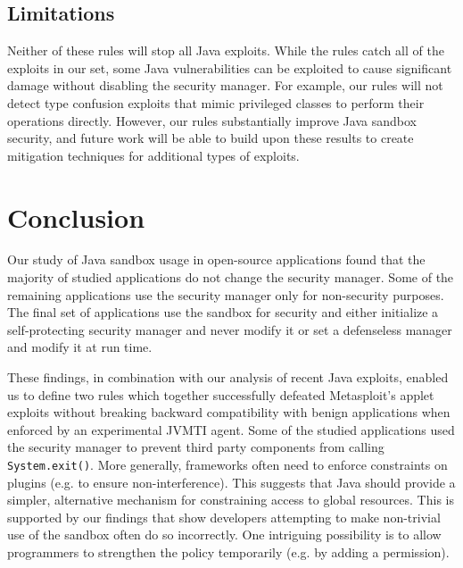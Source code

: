 \documentclass{sig-alternate}
\begin{document}
\subsection{Limitations}

Neither of these rules will stop all Java exploits. While the rules
catch all of the exploits in our set, some Java vulnerabilities can
be exploited to cause significant damage without disabling the security
manager. For example, our rules will not detect type confusion exploits
that mimic privileged classes to perform their operations directly.
However, our rules substantially improve Java sandbox security, and
future work will be able to build upon these results to create mitigation
techniques for additional types of exploits.

\section{Conclusion}

Our study of Java sandbox usage in open-source applications found
that the majority of studied applications do not change the security
manager. Some of the remaining applications use the security manager
only for non-security purposes. The final set of applications use
the sandbox for security and either initialize a self-protecting security
manager and never modify it or set a defenseless manager and modify
it at run time. 

These findings, in combination with our analysis of recent Java exploits,
enabled us to define two rules which together successfully
defeated Metasploit's applet exploits without breaking backward compatibility with benign applications when enforced by an experimental JVMTI agent. Some of the studied applications
used the security manager to prevent third party components from calling
\texttt{System.exit()}. More generally, frameworks often need to enforce
constraints on plugins (e.g. to ensure non-interference). This suggests
that Java should provide a simpler, alternative mechanism for constraining
access to global resources. This is supported by our findings that
show developers attempting to make non-trivial use of the sandbox
often do so incorrectly. One intriguing possibility is to allow programmers
to strengthen the policy temporarily (e.g. by adding a permission). 
\end{document}
